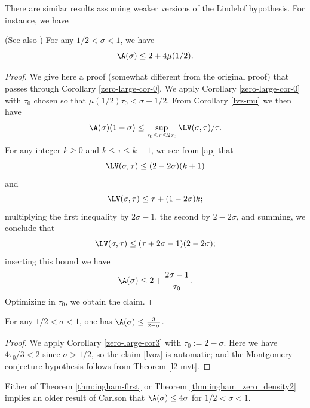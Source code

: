 There are similar results assuming weaker versions of the Lindelof hypothesis. For instance, we have

\begin{theorem}\label{thm:ingham-first} \cite{ingham_difference_1937} (See also \cite{titchmarsh_theory_1986}) For any $1/2 < \sigma < 1$, we have
    $$ \A(\sigma) \leq 2 + 4 \mu(1/2).$$
\end{theorem}

\begin{proof} We give here a proof (somewhat different from the original proof) that passes through Corollary \ref{zero-large-cor-0}.
We apply Corollary \ref{zero-large-cor-0} with $\tau_0$ chosen so that $\mu(1/2) \tau_0 < \sigma-1/2$. From Corollary \ref{lvz-mu} we then have
$$ \A(\sigma)(1-\sigma) \leq \sup_{\tau_0 \leq \tau \leq 2\tau_0} \LV(\sigma,\tau)/\tau.$$
For any integer $k \geq 0$ and $k \leq \tau \leq k+1$, we see from \eqref{ap} that
$$ \LV(\sigma,\tau) \leq (2-2\sigma)(k+1)$$
and
$$ \LV(\sigma,\tau) \leq \tau + (1-2\sigma)k;$$
multiplying the first inequality by $2\sigma-1$, the second by $2-2\sigma$, and summing, we conclude that
$$ \LV(\sigma,\tau) \leq (\tau + 2\sigma-1) (2-2\sigma);$$
inserting this bound we have
$$ \A(\sigma) \leq 2 + \frac{2\sigma-1}{\tau_0}.$$
Optimizing in $\tau_0$, we obtain the claim.
\end{proof}

\begin{theorem}\label{thm:ingham_zero_density2}\cite{ingham_estimation_1940} For any $1/2 < \sigma < 1$, one has $\A(\sigma) \leq \frac{3}{2-\sigma}$.
\end{theorem}
\literature
{}
\derived
{}

\begin{proof}
We apply Corollary \ref{zero-large-cor3} with $\tau_0 := 2-\sigma$.  Here we have $4\tau_0/3 < 2$ since $\sigma>1/2$, so the claim \eqref{lvoz} is automatic; and the Montgomery conjecture hypothesis follows from Theorem \ref{l2-mvt}.
\end{proof}

Either of Theorem \ref{thm:ingham-first} or Theorem \ref{thm:ingham_zero_density2} implies an older result of Carlson \cite{carlson_uber_1921} that $\A(\sigma) \le 4\sigma$ for $1/2 < \sigma < 1$.
\literature
{}

